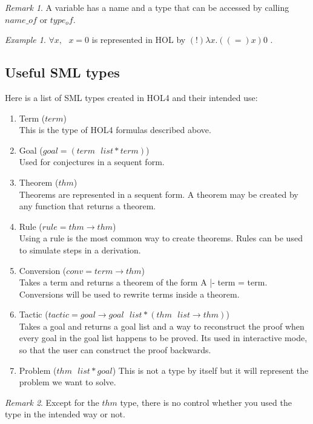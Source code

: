 \documentclass[a4paper, 11pt]{article}
\theoremstyle{plain}
\theoremstyle{definition}
\theoremstyle{remark}
\newtheorem*{remark}{Remark}
\newtheorem*{example}{Example}
\begin{document}
\begin{remark}
A variable has a name and a type that can be accessed by calling $name\_of$ or $type_of$.
\end{remark}

\begin{example}
$\forall x,\mbox{ } x = 0$ is represented in HOL by $(!) \lambda x. ((=) x) 0$ .
\end{example}

\subsection{Useful SML types}
  Here is a list of SML types created in HOL4 and their intended use:
\begin {enumerate}  
  \item Term ($term$)
\\This is the type of HOL4 formulas described above. 
  \item Goal ($goal = (term\mbox{ }list * term)$)
\\Used for conjectures in a sequent form.
  \item Theorem ($thm$) 
\\Theorems are represented in a sequent form. A theorem may be created by any function that returns a theorem.
  \item Rule ($rule = thm \rightarrow thm$)
\\Using a rule is the most common way to create theorems. Rules can be used to simulate steps in a derivation. 
  \item Conversion ($conv = term \rightarrow thm$)
\\Takes a term and returns a theorem of the form A |- term = term. Conversions will be used to rewrite terms inside a theorem.
  \item Tactic ($tactic = goal \rightarrow goal\mbox{ }list * (thm\mbox{ }list \rightarrow thm)$)
\\Takes a goal and returns a goal list and a way to reconstruct the proof when every goal in the goal list happens to be proved. Its used in interactive mode, so that the user can construct the proof backwards.
  \item Problem ($thm\mbox{ }list * goal$)
  This is not a type by itself but it will represent the problem we want to solve.
\end{enumerate}

\begin{remark} Except for the $thm$ type, there is no control whether you used the type in the intended way or not.
\end{remark}
\end{document}

